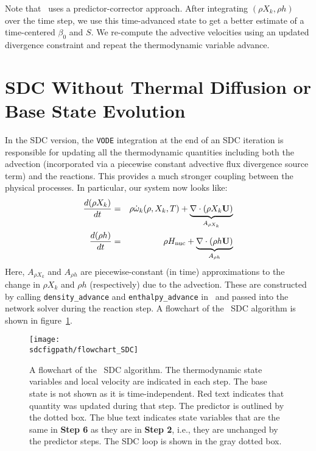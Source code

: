 Note that \maestro\ uses a predictor-corrector approach.  After integrating $(\rho X_k,\rho h)$ over
the time step, we use this time-advanced state to get a better estimate of a time-centered $\beta_0$
and $S$.  We re-compute the advective velocities using an updated divergence constraint and repeat 
the thermodynamic variable advance.

\section{SDC Without Thermal Diffusion or Base State Evolution}
In the SDC version, the {\tt VODE} integration at the end of an SDC
iteration is responsible for updating all the thermodynamic quantities
including both the advection (incorporated via a piecewise constant advective 
flux divergence source term) and the reactions.  This provides a much stronger coupling between
the physical processes.  In particular, our system now looks like:
\begin{eqnarray}
\frac{d(\rho X_k)}{dt} &=& \rho \dot{\omega}_k(\rho,X_k,T) + \underbrace{\nabla\cdot(\rho X_k{\bf U})}_{A_{\rho X_k}}\label{eq:sdc:rhoX} \\
\frac{d(\rho h)}{dt}   &=& \rho {H_{\rm nuc}} + \underbrace{\nabla\cdot(\rho h{\bf U})}_{A_{\rho h}} \label{eq:sdc:rhoh}
\end{eqnarray}
Here, $A_{\rho X_k}$ and $A_{\rho h}$ are piecewise-constant (in time)
approximations to the change in ${\rho X_k}$ and ${\rho h}$ (respectively)
due to the advection.  These are constructed by calling {\tt density\_advance}
and {\tt enthalpy\_advance} in \maestro\ and passed into the network solver
during the reaction step.  A flowchart of the \maestro\ SDC algorithm is 
shown in figure~\ref{fig:sdc:flowchart}.

\begin{figure}[tb]
\centering
\texttt{[image: \\sdcfigpath/flowchart\_SDC]}
\caption[Graphical flowchart of \maestro\ SDC]
  {\label{fig:sdc:flowchart} A flowchart of the \maestro\ SDC algorithm.  The
  thermodynamic state variables and local velocity are
  indicated in each step.  The base state is not shown as it is time-independent.
  Red text indicates that quantity was
  updated during that step.  The predictor is 
  outlined by the dotted box.  The blue text indicates state
  variables that are the same in {\bf Step 6} as they are in
  {\bf Step 2}, i.e., they are unchanged by the predictor steps.
  The SDC loop is shown in the gray dotted box.}
\end{figure}


